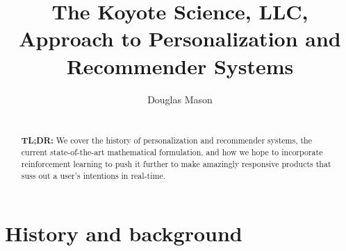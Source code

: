 \documentclass[manuscript, nonacm, screen=true]{acmart}
\begin{document}
\title{The Koyote Science, LLC, Approach to Personalization and Recommender Systems}

\author{Douglas Mason}

\renewcommand{\shortauthors}{The Koyote Science, LLC, Approach to Personalization and Recommender Systems} %





\begin{abstract}
\\
\textbf{TL;DR:} We cover the history of personalization and recommender systems, the current state-of-the-art mathematical formulation, and how we hope to incorporate reinforcement learning to push it further to make amazingly responsive products that suss out a user's intentions in real-time.
\end{abstract}

\maketitle

\pagestyle{fancy}

\section{History and background}
\end{document}
